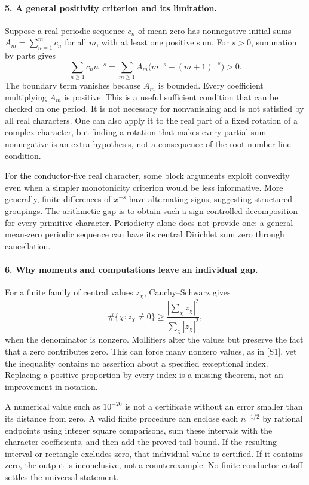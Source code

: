 \documentclass[11pt]{article}
\begin{document}
\paragraph{5. A general positivity criterion and its limitation.}
Suppose a real periodic sequence $c_n$ of mean zero has nonnegative initial sums $A_m=\sum_{n=1}^m c_n$ for all $m$, with at least one positive sum. For $s>0$, summation by parts gives
\[
 \sum_{n\geq1}c_n n^{-s}
 =\sum_{m\geq1}A_m\bigl(m^{-s}-(m+1)^{-s}\bigr)>0.
\]
The boundary term vanishes because $A_m$ is bounded. Every coefficient multiplying $A_m$ is positive. This is a useful sufficient condition that can be checked on one period. It is not necessary for nonvanishing and is not satisfied by all real characters. One can also apply it to the real part of a fixed rotation of a complex character, but finding a rotation that makes every partial sum nonnegative is an extra hypothesis, not a consequence of the root-number line condition.

For the conductor-five real character, some block arguments exploit convexity even when a simpler monotonicity criterion would be less informative. More generally, finite differences of $x^{-s}$ have alternating signs, suggesting structured groupings. The arithmetic gap is to obtain such a sign-controlled decomposition for every primitive character. Periodicity alone does not provide one: a general mean-zero periodic sequence can have its central Dirichlet sum zero through cancellation.

\paragraph{6. Why moments and computations leave an individual gap.}
For a finite family of central values $z_\chi$, Cauchy--Schwarz gives
\[
 \#\{\chi:z_\chi\ne0\}\geq
 \frac{|\sum_\chi z_\chi|^2}{\sum_\chi|z_\chi|^2},
\]
when the denominator is nonzero. Mollifiers alter the values but preserve the fact that a zero contributes zero. This can force many nonzero values, as in [S1], yet the inequality contains no assertion about a specified exceptional index. Replacing a positive proportion by every index is a missing theorem, not an improvement in notation.

A numerical value such as $10^{-20}$ is not a certificate without an error smaller than its distance from zero. A valid finite procedure can enclose each $n^{-1/2}$ by rational endpoints using integer square comparisons, sum these intervals with the character coefficients, and then add the proved tail bound. If the resulting interval or rectangle excludes zero, that individual value is certified. If it contains zero, the output is inconclusive, not a counterexample. No finite conductor cutoff settles the universal statement.
\end{document}

